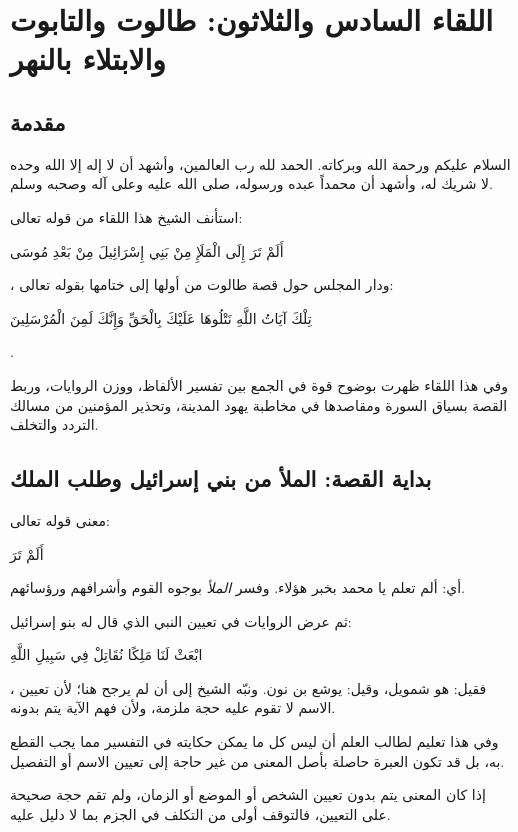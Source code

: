 \chapter{اللقاء السادس والثلاثون: طالوت والتابوت والابتلاء بالنهر}

\section{مقدمة}
السلام عليكم ورحمة الله وبركاته. الحمد لله رب العالمين، وأشهد أن لا إله إلا الله وحده لا شريك له، وأشهد أن محمداً عبده ورسوله، صلى الله عليه وعلى آله وصحبه وسلم.

استأنف الشيخ هذا اللقاء من قوله تعالى: \begin{ayah}أَلَمْ تَرَ إِلَى الْمَلَإِ مِنْ بَنِي إِسْرَائِيلَ مِنْ بَعْدِ مُوسَى\end{ayah}، ودار المجلس حول قصة طالوت من أولها إلى ختامها بقوله تعالى: \begin{ayah}تِلْكَ آيَاتُ اللَّهِ نَتْلُوهَا عَلَيْكَ بِالْحَقِّ وَإِنَّكَ لَمِنَ الْمُرْسَلِينَ\end{ayah}.

وفي هذا اللقاء ظهرت بوضوح قوة  في الجمع بين تفسير الألفاظ، ووزن الروايات، وربط القصة بسياق السورة ومقاصدها في مخاطبة يهود المدينة، وتحذير المؤمنين من مسالك التردد والتخلف.

\separator

\section{بداية القصة: الملأ من بني إسرائيل وطلب الملك}
 معنى قوله تعالى: \begin{ayah}أَلَمْ تَرَ\end{ayah} أي: ألم تعلم يا محمد بخبر هؤلاء. وفسر  \textit{الملأ} بوجوه القوم وأشرافهم ورؤسائهم.

ثم عرض الروايات في تعيين النبي الذي قال له بنو إسرائيل: \begin{ayah}ابْعَثْ لَنَا مَلِكًا نُقَاتِلْ فِي سَبِيلِ اللَّهِ\end{ayah}، فقيل: هو شمويل، وقيل: يوشع بن نون. ونبّه الشيخ إلى أن  لم يرجح هنا؛ لأن تعيين الاسم لا تقوم عليه حجة ملزمة، ولأن فهم الآية يتم بدونه.

وفي هذا تعليم لطالب العلم أن ليس كل ما يمكن حكايته في التفسير مما يجب القطع به، بل قد تكون العبرة حاصلة بأصل المعنى من غير حاجة إلى تعيين الاسم أو التفصيل.

\begin{fawaid}
إذا كان المعنى يتم بدون تعيين الشخص أو الموضع أو الزمان، ولم تقم حجة صحيحة على التعيين، فالتوقف أولى من التكلف في الجزم بما لا دليل عليه.
\end{fawaid}

